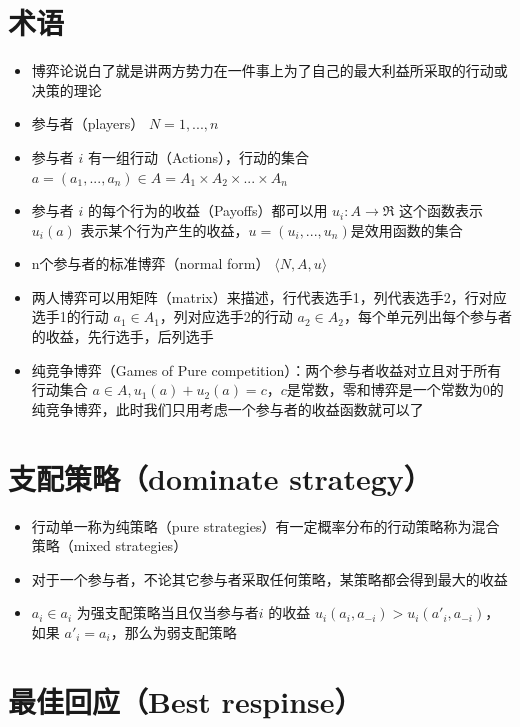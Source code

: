 \documentclass[]{book}
\providecommand{\tightlist}{%
  \setlength{\itemsep}{0pt}\setlength{\parskip}{0pt}}
\begin{document}
\hypertarget{ux672fux8bed-1}{%
\section{术语}\label{ux672fux8bed-1}}

\begin{itemize}
\tightlist
\item
  博弈论说白了就是讲两方势力在一件事上为了自己的最大利益所采取的行动或决策的理论
\item
  参与者（players） \(N= {1,...,n}\)
\item
  参与者 \(i\) 有一组行动（Actions），行动的集合 \(a=(a_1,...,a_n) \in A=A_1 \times A_2 \times ... \times A_n\)
\item
  参与者 \(i\) 的每个行为的收益（Payoffs）都可以用 \(u_i:A \rightarrow \Re\) 这个函数表示 \(u_i(a)\) 表示某个行为产生的收益，\(u = (u_i,...,u_n)\)是效用函数的集合
\item
  n个参与者的标准博弈（normal form） \(\langle N,A,u \rangle\)
\item
  两人博弈可以用矩阵（matrix）来描述，行代表选手1，列代表选手2，行对应选手1的行动 \(a_1 \in A_1\)，列对应选手2的行动 \(a_2 \in A_2\)，每个单元列出每个参与者的收益，先行选手，后列选手
\item
  纯竞争博弈（Games of Pure competition）：两个参与者收益对立且对于所有行动集合 \(a \in A, u_1(a)+u_2(a) = c\)，\(c\)是常数，零和博弈是一个常数为0的纯竞争博弈，此时我们只用考虑一个参与者的收益函数就可以了
\end{itemize}

\hypertarget{ux652fux914dux7b56ux7565dominate-strategy}{%
\section{支配策略（dominate strategy）}\label{ux652fux914dux7b56ux7565dominate-strategy}}

\begin{itemize}
\tightlist
\item
  行动单一称为纯策略（pure strategies）有一定概率分布的行动策略称为混合策略（mixed strategies）
\item
  对于一个参与者，不论其它参与者采取任何策略，某策略都会得到最大的收益
\item
  \(a_i \in a_i\) 为强支配策略当且仅当参与者\(i\) 的收益 \(u_i(a_i,a_{-i}) > u_i(a'_i,a_{-i})\)，如果 \(a'_i = a_i\)，那么为弱支配策略
\end{itemize}

\hypertarget{ux6700ux4f73ux56deux5e94best-respinse}{%
\section{最佳回应（Best respinse）}\label{ux6700ux4f73ux56deux5e94best-respinse}}
\end{document}
